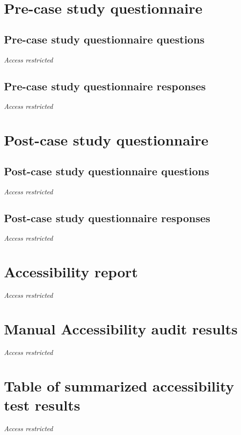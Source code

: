 \documentclass{master_thesis}
\begin{document}
\appendix

\renewcommand{\thesection}{\arabic{section}}

\section{Pre-case study questionnaire }\label{appendix:pre-survey}
\subsection{Pre-case study questionnaire questions}\label{appendix:pre-survey-questions}
\textit{Access restricted}

\subsection{Pre-case study questionnaire responses}\label{appendix:pre-survey-responses}
\textit{Access restricted}

\section{Post-case study questionnaire }\label{appendix:post-survey}
\subsection{Post-case study questionnaire questions}\label{appendix:post-survey-questions}
\textit{Access restricted}

\subsection{Post-case study questionnaire responses}\label{appendix:post-survey-responses}
\textit{Access restricted}

\section{Accessibility report}\label{appendix:report}
\textit{Access restricted}

\section{Manual Accessibility audit results}\label{appendix:manual-audit}
\textit{Access restricted}

\section{Table of summarized accessibility test results}\label{appendix:results-table}
\textit{Access restricted}
\end{document}
